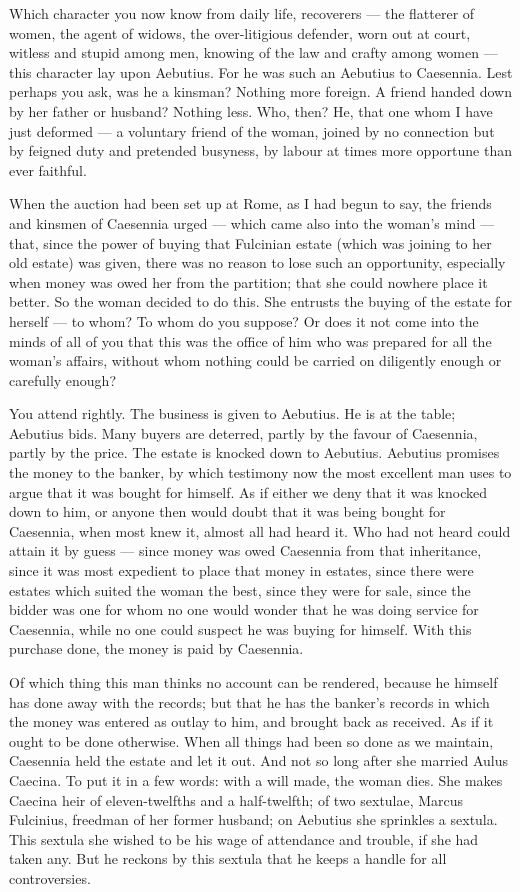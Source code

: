  Which character you now know from daily life, recoverers --- the flatterer of women, the agent of widows, the over-litigious defender, worn out at court, witless and stupid among men, knowing of the law and crafty among women --- this character lay upon Aebutius. For he was such an Aebutius to Caesennia. Lest perhaps you ask, was he a kinsman? Nothing more foreign. A friend handed down by her father or husband? Nothing less. Who, then? He, that one whom I have just deformed --- a voluntary friend of the woman, joined by no connection but by feigned duty and pretended busyness, by labour at times more opportune than ever faithful.

 When the auction had been set up at Rome, as I had begun to say, the friends and kinsmen of Caesennia urged --- which came also into the woman's mind --- that, since the power of buying that Fulcinian estate (which was joining to her old estate) was given, there was no reason to lose such an opportunity, especially when money was owed her from the partition; that she could nowhere place it better. So the woman decided to do this. She entrusts the buying of the estate for herself --- to whom? To whom do you suppose? Or does it not come into the minds of all of you that this was the office of him who was prepared for all the woman's affairs, without whom nothing could be carried on diligently enough or carefully enough?

 You attend rightly. The business is given to Aebutius. He is at the table; Aebutius bids. Many buyers are deterred, partly by the favour of Caesennia, partly by the price. The estate is knocked down to Aebutius. Aebutius promises the money to the banker, by which testimony now the most excellent man uses to argue that it was bought for himself. As if either we deny that it was knocked down to him, or anyone then would doubt that it was being bought for Caesennia, when most knew it, almost all had heard it. Who had not heard could attain it by guess --- since money was owed Caesennia from that inheritance, since it was most expedient to place that money in estates, since there were estates which suited the woman the best, since they were for sale, since the bidder was one for whom no one would wonder that he was doing service for Caesennia, while no one could suspect he was buying for himself. With this purchase done, the money is paid by Caesennia.

 Of which thing this man thinks no account can be rendered, because he himself has done away with the records; but that he has the banker's records in which the money was entered as outlay to him, and brought back as received. As if it ought to be done otherwise. When all things had been so done as we maintain, Caesennia held the estate and let it out. And not so long after she married Aulus Caecina. To put it in a few words: with a will made, the woman dies. She makes Caecina heir of eleven-twelfths and a half-twelfth; of two sextulae, Marcus Fulcinius, freedman of her former husband; on Aebutius she sprinkles a sextula. This sextula she wished to be his wage of attendance and trouble, if she had taken any. But he reckons by this sextula that he keeps a handle for all controversies.


